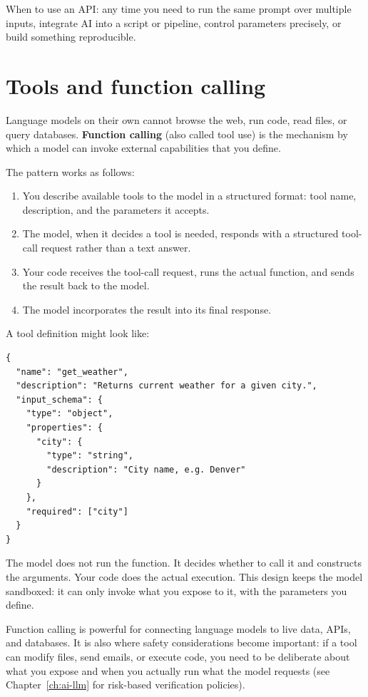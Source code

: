 When to use an API: any time you need to run the same prompt over multiple inputs, integrate AI into a script or pipeline, control parameters precisely, or build something reproducible.

\section{Tools and function calling}

Language models on their own cannot browse the web, run code, read files, or query databases. \textbf{Function calling} (also called tool use) is the mechanism by which a model can invoke external capabilities that you define.

The pattern works as follows:

\begin{enumerate}[noitemsep,topsep=0pt]
  \item You describe available tools to the model in a structured format: tool name, description, and the parameters it accepts.
  \item The model, when it decides a tool is needed, responds with a structured tool-call request rather than a text answer.
  \item Your code receives the tool-call request, runs the actual function, and sends the result back to the model.
  \item The model incorporates the result into its final response.
\end{enumerate}

A tool definition might look like:

\begin{verbatim}
{
  "name": "get_weather",
  "description": "Returns current weather for a given city.",
  "input_schema": {
    "type": "object",
    "properties": {
      "city": {
        "type": "string",
        "description": "City name, e.g. Denver"
      }
    },
    "required": ["city"]
  }
}
\end{verbatim}

The model does not run the function. It decides whether to call it and constructs the arguments. Your code does the actual execution. This design keeps the model sandboxed: it can only invoke what you expose to it, with the parameters you define.


Function calling is powerful for connecting language models to live data, APIs, and databases. It is also where safety considerations become important: if a tool can modify files, send emails, or execute code, you need to be deliberate about what you expose and when you actually run what the model requests (see Chapter~\ref{ch:ai-llm} for risk-based verification policies).


